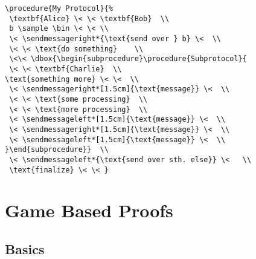 \documentclass[a4paper]{report}
\begin{document}
\begin{lstlisting}
\procedure{My Protocol}{%
 \textbf{Alice} \< \< \textbf{Bob}  \\
 b \sample \bin \< \< \\
 \< \sendmessageright*{\text{send over } b} \<  \\
 \< \< \text{do something}    \\
 \<\< \dbox{\begin{subprocedure}\procedure{Subprotocol}{
 \< \< \textbf{Charlie}  \\
\text{something more} \< \<  \\
 \< \sendmessageright*[1.5cm]{\text{message}} \<  \\
 \< \< \text{some processing}  \\
 \< \< \text{more processing}  \\
 \< \sendmessageleft*[1.5cm]{\text{message}} \<  \\
 \< \sendmessageright*[1.5cm]{\text{message}} \<  \\
 \< \sendmessageleft*[1.5cm]{\text{message}} \<  \\
}\end{subprocedure}}  \\
 \< \sendmessageleft*{\text{send over sth. else}} \<   \\
 \text{finalize} \< \< }
\end{lstlisting}






\chapter{Game Based Proofs}
\label{chap:gbproofs}

\section{Basics}
\end{document}
